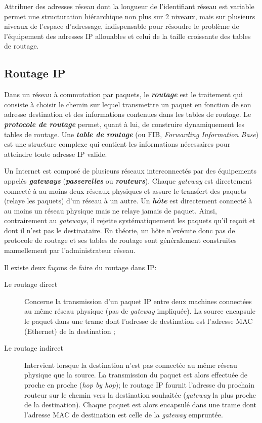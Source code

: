 \documentclass[11pt,english,french]{scrreprt}
\theoremstyle{remark}
\theoremstyle{definition}
\begin{document}
Attribuer des adresses réseau dont la longueur de l'identifiant réseau est variable permet une structuration hiérarchique non plus sur 2 niveaux, mais sur plusieurs niveaux de l'espace d'adressage, indispensable pour résoudre le problème de l'équipement des adresses IP allouables et celui de la taille croissante des tables de routage.

\subsection{Routage IP} %

Dans un réseau à commutation par paquets, le \emph{\textbf{routage}} est le traitement qui consiste à choisir le chemin sur lequel transmettre un paquet en fonction de son adresse destination et des informations contenues dans les tables de routage. Le \emph{\textbf{protocole de routage}} permet, quant à lui, de construire dynamiquement les tables de routage. Une \emph{\textbf{table de routage}} (ou FIB, \emph{Forwarding Information Base}) est une structure complexe qui contient les informations nécessaires pour atteindre toute adresse IP valide.

Un Internet est composé de plusieurs réseaux interconnectés par des équipements appelés \emph{\textbf{gateways}} (\emph{\textbf{passerelles}} ou \emph{\textbf{routeurs}}). Chaque \emph{gateway} est directement connecté à au moins deux réseaux physiques et assure le transfert des paquets (relaye les paquets) d'un réseau à un autre. Un \emph{\textbf{hôte}} est directement connecté à au moins un réseau physique mais ne relaye jamais de paquet. Ainsi, contrairement au \emph{gateways}, il rejette systématiquement les paquets qu'il reçoit et dont il n'est pas le destinataire. En théorie, un hôte n'exécute donc pas de protocole de routage et ses tables de routage sont généralement construites manuellement par l'administrateur réseau.

Il existe deux façons de faire du routage dans IP:\begin{description}
	\item[Le routage direct] Concerne la transmission d'un paquet IP entre deux machines connectées au même réseau physique (pas de \emph{gateway} impliquée). La source encapsule le paquet dans une trame dont l'adresse de destination est l'adresse MAC (Ethernet) de la destination ;
	\item[Le routage indirect] Intervient lorsque la destination n'est pas connectée au même réseau physique que la source. La transmission du paquet est alors effectuée de proche en proche (\emph{hop by hop}); le routage IP fournit l'adresse du prochain routeur sur le chemin vers la destination souhaitée (\emph{gateway} la plus proche de la destination). Chaque paquet est alors encapsulé dans une trame dont l'adresse MAC de destination est celle de la \emph{gateway} empruntée.
\end{description}
	
\end{document}
